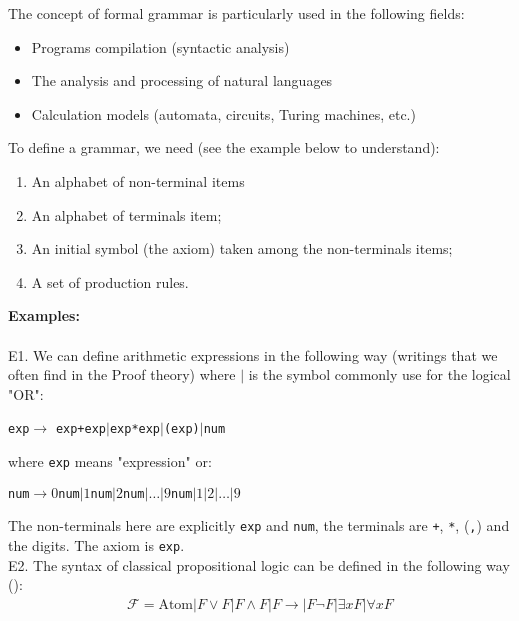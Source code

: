 	The concept of formal grammar is particularly used in the following fields:
	\begin{itemize}
		\item Programs compilation (syntactic analysis)

		\item The analysis and processing of natural languages

		\item Calculation models (automata, circuits, Turing machines, etc.)
	\end{itemize}
	To define a grammar, we need (see the example below to understand):
	\begin{enumerate}
		\item An alphabet of non-terminal items

		\item An alphabet of terminals item;

		\item An initial symbol (the axiom) taken among the non-terminals items;

		\item A set of production rules.
	\end{enumerate}
	\begin{tcolorbox}[colframe=black,colback=white,sharp corners]
	\textbf{{\Large {}}Examples:}\\\\
	E1. We can define arithmetic expressions in the following way (writings that we often find in the Proof theory) where $|$ is the symbol commonly use for the logical "OR":
	\begin{center}
		\texttt{exp}$\rightarrow$ \texttt{exp+exp}$|$\texttt{exp*exp}$|$\texttt{(exp)}$|$\texttt{num}
	\end{center}
	where \texttt{exp} means "expression" or:
	\begin{center}
		\texttt{num}$\rightarrow 0$\texttt{num}$|1$\texttt{num}$|2$\texttt{num}$|\ldots|9$\texttt{num}$|1|2|\ldots|9$
	\end{center}
	The non-terminals here are explicitly \texttt{exp} and \texttt{num}, the terminals are \texttt{+}, \texttt{*}, (\texttt{,}) and the digits. The axiom is \texttt{exp}.\\
	
	E2. The syntax of classical propositional logic can be defined in the following way ():
	\begin{gather*}
		\mathcal{F}=\text{Atom}|F\vee F|F\wedge F|F\rightarrow|F\neg F|\exists x F|\forall xF
	\end{gather*}
	\end{tcolorbox}
